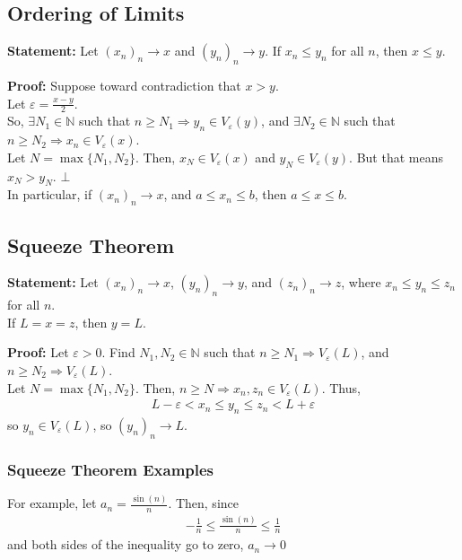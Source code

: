 \documentclass[10pt]{extarticle}
\newcommand{\N}{\mathbb{N}}
\begin{document}
  \subsection{Ordering of Limits}%
  \textbf{Statement:} Let $(x_n)_n \rightarrow x$ and $(y_n)_n \rightarrow y$. If $x_n \leq y_n$ for all $n$, then $x \leq y$.

  \textbf{Proof:} Suppose toward contradiction that $x > y$.\\
    
    Let $\varepsilon = \frac{x-y}{2}$.\\

    So, $\exists N_1\in\N$ such that $n\geq N_1 \Rightarrow y_n\in V_{\varepsilon}(y)$, and $\exists N_2\in\N$ such that $n\geq N_2 \Rightarrow x_n\in V_{\varepsilon}(x)$.\\
    
    Let $N = \max\{N_1,N_2\}$. Then, $x_N\in V_{\varepsilon}(x)$ and $y_N\in V_{\varepsilon}(y)$. But that means $x_N > y_N$. $\bot$\\

    In particular, if $(x_n)_n \rightarrow x$, and $a \leq x_n \leq b$, then $a\leq x \leq b$.
  \subsection{Squeeze Theorem}%
  \textbf{Statement:} Let $(x_n)_n \rightarrow x$, $(y_n)_n\rightarrow y$, and $(z_n)_n \rightarrow z$, where $x_n \leq y_n \leq z_n$ for all $n$.\\

    If $L = x = z$, then $y = L$.
    
    \textbf{Proof:} Let $\varepsilon > 0$. Find $N_1,N_2\in\N$ such that $n\geq N_1 \Rightarrow V_{\varepsilon}(L)$, and $n\geq N_{2} \Rightarrow V_{\varepsilon}(L)$.\\

    Let $N = \max\{N_1,N_2\}$. Then, $n\geq N \Rightarrow x_n,z_n\in V_{\varepsilon}(L)$. Thus,
    \begin{align*}
      L-\varepsilon < x_n \leq y_n \leq z_n < L + \varepsilon
    \end{align*}
    so $y_n\in V_{\varepsilon}(L)$, so $(y_n)_n \rightarrow L$.\\
    \subsubsection{Squeeze Theorem Examples}%
    
    For example, let $a_n = \frac{\sin(n)}{n}$. Then, since
    \begin{align*}
      -\frac{1}{n} \leq \frac{\sin(n)}{n} \leq \frac{1}{n}
    \end{align*}
    and both sides of the inequality go to zero, $a_n \rightarrow 0$\\
\end{document}

